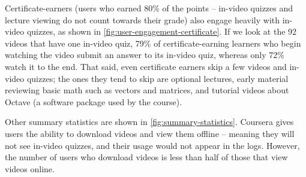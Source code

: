 \documentclass{sigchi}
\begin{document}

Certificate-earners (users who earned 80\% of the points -- in-video quizzes and lecture viewing do not count towards their grade) also engage heavily with in-video quizzes, as shown in \autoref{fig:user-engagement-certificate}. If we look at the 92 videos that have one in-video quiz, 79\% of certificate-earning learners who begin watching the video submit an answer to its in-video quiz, whereas only 72\% watch it to the end. That said, even certificate earners skip a few videos and in-video quizzes; the ones they tend to skip are optional lectures, early material reviewing basic math such as vectors and matrices, and tutorial videos about Octave (a software package used by the course).

Other summary statistics are shown in \autoref{fig:summary-statistics}. Coursera gives users the ability to download videos and view them offline -- meaning they will not see in-video quizzes, and their usage would not appear in the logs. However, the number of users who download videos is less than half of those that view videos online. 

\end{document}

